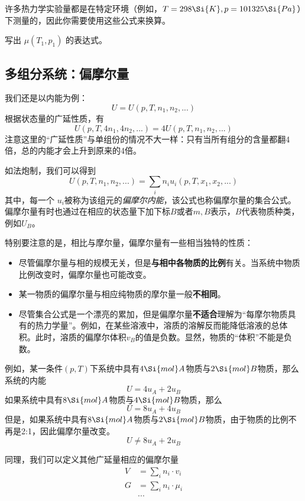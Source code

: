 许多热力学实验量都是在特定环境（例如，$T = 298 \Si{K}, p = 101325\Si{Pa}$）下测量的，因此你需要使用这些公式来换算。

\begin{exercise}{}
写出 $\mu(T_1,p_1)$ 的表达式。
\end{exercise}

\subsection{多组分系统：偏摩尔量}
我们还是以内能为例：
$$U = U (p, T, n_1, n_2, ...)$$
根据状态量的广延性质，有
$$ U (p, T, 4n_1, 4n_2, ...) = 4U (p, T, n_1, n_2, ...)$$
注意这里的“广延性质”与单组份的情况不大一样：只有当所有组分的含量都翻4倍，总的内能才会上升到原来的4倍。

如法炮制，我们可以得到
$$ U (p, T, n_1, n_2, ...) = \sum_i n_i u_i(p, T, x_1, x_2, ...) $$
其中，每一个 $u_i$被称为该组元的\textsl{偏摩尔内能}，该公式也称偏摩尔量的集合公式。偏摩尔量有时也通过在相应的状态量下加下标$B$或者$m,B$表示，$B$代表物质种类，例如$U_B$。

特别要注意的是，相比与摩尔量，偏摩尔量有一些相当独特的性质：
\begin{itemize}
\item 尽管偏摩尔量与相的规模无关，但是\textbf{与相中各物质的比例}有关。当系统中物质比例改变时，偏摩尔量也可能改变。
\item 某一物质的偏摩尔量与相应纯物质的摩尔量一般\textbf{不相同}。
\item 尽管集合公式是一个漂亮的累加，但是偏摩尔量\textbf{不适合}理解为“每摩尔物质具有的热力学量”。例如，在某些溶液中，溶质的溶解反而能降低溶液的总体积。此时，溶质的偏摩尔体积$v_B$的值是负数。显然，物质的“体积”不能是负数。
\end{itemize}

\begin{example}{}
例如，某一条件$(p,T)$下系统中具有$4 \Si{mol} A$物质与$2 \Si{mol} B$物质，那么系统的内能
$$U = 4 u_{A} +  2 u_B $$
如果系统中具有$8 \Si{mol} A$物质与$4 \Si{mol} B$物质，那么
$$U = 8 u_A +  4 u_B$$
但是，如果系统中具有$8 \Si{mol} A$物质与$2 \Si{mol} B$物质，由于物质的比例不再是2:1，因此偏摩尔量改变。
$$U \ne 8 u_A +  2 u_B$$
\end{example}

同理，我们可以定义其他广延量相应的偏摩尔量
$$
\begin{aligned}
V &= \sum_i  n_i \cdot v_i \\
G &= \sum_i  n_i \cdot \mu_i \\
&...\\
\end{aligned}
$$

